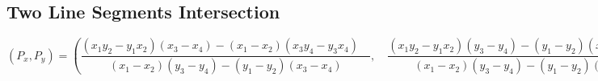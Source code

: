 \documentclass[a4paper]{article}
\begin{document}
\subsection{Two Line Segments Intersection}
${ \left( { P }_{ x }, { P }_{ y } \right) }= \left( \dfrac { \left( { x }_{ 1 }{ y }_{ 2 }-{ y }_{ 1 }{ x }_{ 2 } \right) \left( { x }_{ 3 }-{ x }_{ 4 } \right) -\left( { x }_{ 1 }-{ x }_{ 2 } \right) \left( { x }_{ 3 }{ y }_{ 4 }-{ y }_{ 3 }{ x }_{ 4 } \right) \quad  }{ \left( { x }_{ 1 }-{ x }_{ 2 } \right) \left( { y }_{ 3 }-{ y }_{ 4 } \right) -\left( { y }_{ 1 }-{ y }_{ 2 } \right) \left( { x }_{ 3 }-{ x }_{ 4 } \right)  } ,\quad \dfrac { \left( { x }_{ 1 }{ y }_{ 2 }-{ y }_{ 1 }{ x }_{ 2 } \right) \left( { y }_{ 3 }-{ y }_{ 4 } \right) -\left( { y }_{ 1 }-{ y }_{ 2 } \right) \left( { x }_{ 3 }{ y }_{ 4 }-{ y }_{ 3 }{ x }_{ 4 } \right) \quad  }{ \left( { x }_{ 1 }-{ x }_{ 2 } \right) \left( { y }_{ 3 }-{ y }_{ 4 } \right) -\left( { y }_{ 1 }-{ y }_{ 2 } \right) \left( { x }_{ 3 }-{ x }_{ 4 } \right)  }  \right) $
\end{document}
